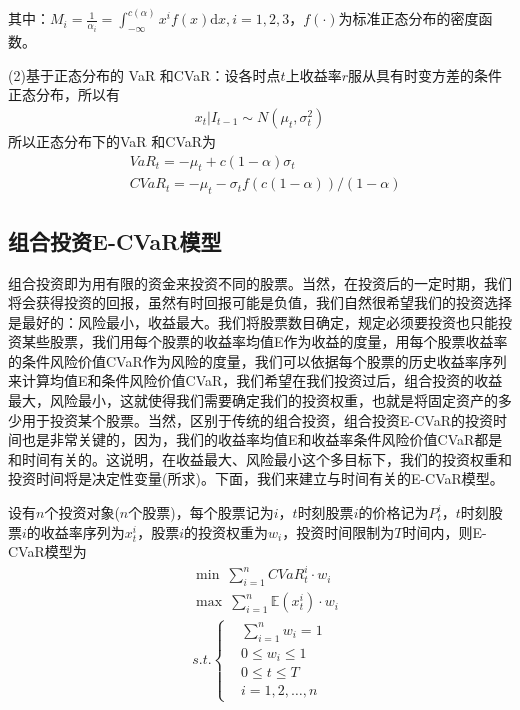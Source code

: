         其中：$M_i = \frac{1}{\alpha_i} = \int_{-\infty}^{c(\alpha)}x^if(x)\mathrm{d}x,i=1,2,3$，$f(\cdot)$为标准正态分布的密度函数。
        \par
        (2)基于正态分布的 VaR 和CVaR：设各时点$t$上收益率$r$服从具有时变方差的条件正态分布，所以有
        \begin{align*}
        x_t|I_{t-1} \sim N(\mu_t,\sigma_t^2)
        \end{align*}
        所以正态分布下的VaR 和CVaR为
        \begin{align*}
        & VaR_t = -\mu_t+c(1-\alpha)\sigma_t\\
        & CVaR_t = -\mu_t-\sigma_tf(c(1-\alpha))/(1-\alpha)
        \end{align*}
    \subsection{组合投资E-CVaR模型}
        \par
        组合投资即为用有限的资金来投资不同的股票。当然，在投资后的一定时期，我们将会获得投资的回报，虽然有时回报可能是负值，我们自然很希望我们的投资选择是最好的：风险最小，收益最大。我们将股票数目确定，规定必须要投资也只能投资某些股票，我们用每个股票的收益率均值E作为收益的度量，用每个股票收益率的条件风险价值CVaR作为风险的度量，我们可以依据每个股票的历史收益率序列来计算均值E和条件风险价值CVaR，我们希望在我们投资过后，组合投资的收益最大，风险最小，这就使得我们需要确定我们的投资权重，也就是将固定资产的多少用于投资某个股票。当然，区别于传统的组合投资，组合投资E-CVaR的投资时间也是非常关键的，因为，我们的收益率均值E和收益率条件风险价值CVaR都是和时间有关的。这说明，在收益最大、风险最小这个多目标下，我们的投资权重和投资时间将是决定性变量(所求)。下面，我们来建立与时间有关的E-CVaR模型。
        \par
        设有$n$个投资对象($n$个股票)，每个股票记为$i$，$t$时刻股票$i$的价格记为$P_t^i$，$t$时刻股票$i$的收益率序列为$x_t^i$，股票$i$的投资权重为$w_i$，投资时间限制为$T$时间内，则E-CVaR模型为
        \begin{align*}
        & \min\ \sum_{i=1}^n CVaR_t^i \cdot w_i\\
        & \max\ \sum_{i=1}^n \mathbb{E}(x_t^i)\cdot w_i\\
        & s.t.\left\{
        \begin{aligned}
        & \sum_{i=1}^n w_i =1\\
        & 0 \leqslant w_i \leqslant 1\\
        & 0 \leqslant t \leqslant T\\
        & i=1,2,\dots,n
        \end{aligned}
        \right.
        \end{align*}
